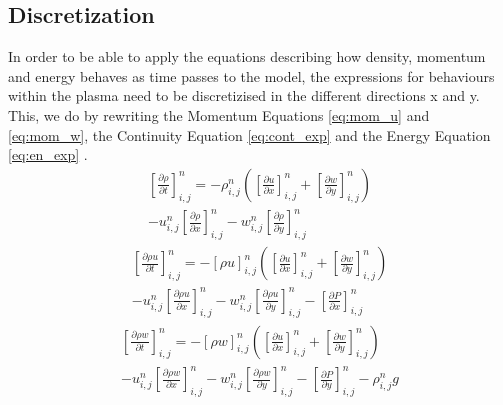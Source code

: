 \documentclass[10pt, nofootinbib, twocolumn]{revtex4-1}
\begin{document}
\subsection{Discretization}
In order to be able to apply the equations describing how density, momentum and energy behaves as time passes to the model, the expressions for behaviours within the plasma need to be discretizised in the different directions x and y. This, we do by rewriting the Momentum Equations \eqref{eq:mom_u} and \eqref{eq:mom_w}, the Continuity Equation \eqref{eq:cont_exp} and the Energy Equation \eqref{eq:en_exp} . 
\begin{equation}\label{eq:cont_dis}
\begin{split}
       \left[\frac{\partial \rho}{\partial t}\right]^{n}_{i,j} =
    -\rho_{i,j}^n\left( \left[\frac{\partial u}{\partial x}\right]^{n}_{i,j} +  \left[\frac{\partial w}{\partial y}\right]^{n}_{i,j}  \right) \\
    -u_{i,j}^n\left[\frac{\partial \rho}{\partial x}\right]^{n}_{i,j}
    -w_{i,j}^n\left[\frac{\partial \rho}{\partial y}\right]^{n}_{i,j} 
\end{split}
\end{equation}
\begin{equation}\label{eq:momu_dis}
\begin{split}
        \left[\frac{\partial \rho u}{\partial t}\right]^{n}_{i,j} = 
    -[\rho u]_{i,j}^n\left( \left[\frac{\partial u}{\partial x}\right]^{n}_{i,j} +  \left[\frac{\partial w}{\partial y}\right]^{n}_{i,j}  \right) \\
    -u_{i,j}^n\left[\frac{\partial \rho u}{\partial x}\right]^{n}_{i,j}
    -w_{i,j}^n\left[\frac{\partial \rho u}{\partial y}\right]^{n}_{i,j}
    -\left[\frac{\partial P}{\partial x}\right]^{n}_{i,j}
\end{split}
\end{equation}
\begin{equation}\label{eq:momw_dis}
\begin{split}
    \left[\frac{\partial \rho w}{\partial t}\right]^{n}_{i,j} = 
    -[\rho w]_{i,j}^n\left( \left[\frac{\partial u}{\partial x}\right]^{n}_{i,j} +  \left[\frac{\partial w}{\partial y}\right]^{n}_{i,j}  \right) \\
    -u_{i,j}^n\left[\frac{\partial \rho w}{\partial x}\right]^{n}_{i,j}
    -w_{i,j}^n\left[\frac{\partial \rho w}{\partial y}\right]^{n}_{i,j}
    -\left[\frac{\partial P}{\partial y}\right]^{n}_{i,j}-\rho_{i,j}^n g
\end{split}
\end{equation}
\end{document}
